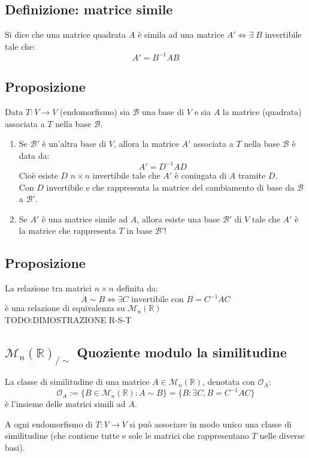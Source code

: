 \subsection{Definizione: matrice simile}
Si dice che una matrice quadrata $A$ è simila ad una matrice $A'\Leftrightarrow\exists\; B$ invertibile tale che:
\[A'=B^{-1}AB\]

\subsection{Proposizione}
Data $T:V\rightarrow V$ (endomorfismo) sia $\mathcal{B}$ una base di $V$ e sia $A$ la matrice (quadrata) associata a $T$ nella base $\mathcal{B}$.
\begin{enumerate}
\item Se $\mathcal{B}'$ è un'altra base di $V$, allora la matrice $A'$ associata a $T$ nella base $\mathcal{B}$ è data da:
  \[A'=D^{-1}AD\]
  Cioè esiste $D$ $n\times n$ invertibile tale che $A'$ è coniugata di $A$ tramite $D$.
  \\Con $D$ invertibile e che rappresenta la matrice del cambiamento di base da $\mathcal{B}$ a $\mathcal{B}'$.

\item Se $A'$ è una matrice simile ad $A$, allora esiste una base $\mathcal{B}'$ di $V$ tale che $A'$ è la matrice che rappresenta $T$ in base $\mathcal{B}'$!

\end{enumerate}

\subsection{Proposizione}
La relazione tra matrici $n\times n$ definita da:
\[A\sim B\Leftrightarrow\exists C\text{ invertibile con } B=C^{-1}AC\]
è una relazione di equivalenza su $\mathcal{M}_n(\mathbb{R})$
\\TODO:DIMOSTRAZIONE R-S-T

\subsection{$\mathcal{M}_n(\mathbb{R})_{/\sim}$ Quoziente modulo la similitudine}
La classe di similitudine di una matrice $A\in \mathcal{M}_n(\mathbb{R})$, denotata con $\mathcal{O}_A$:
\[\mathcal{O}_A:=\{B\in\mathcal{M}_n(\mathbb{R}): A\sim B\}=\{B:\exists C, B=C^{-1}AC\}\]
è l'insieme delle matrici simili ad $A$.

A ogni endomorfismo di $T:V\rightarrow V$ si può associare in modo unico una classe di similitudine (che contiene tutte e sole le matrici che rappresentano $T$ nelle diverse basi).

